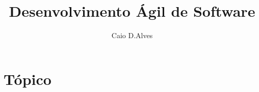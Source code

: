\documentclass[12pt]{article}
\title{Desenvolvimento Ágil de Software}
\author{Caio D.Alves\inst{1,2}}
\begin{document}
 

\maketitle

\begin{abstract}

\end{abstract}
     
\begin{resumo} 

\end{resumo}


\section{Tópico}



\end{document}
